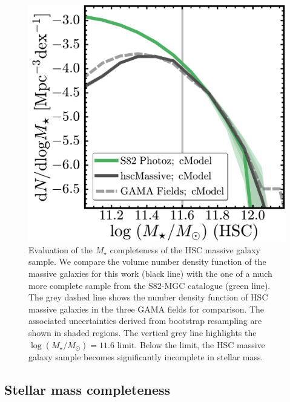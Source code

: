 \documentclass[fleqn,usenatbib]{mnras}
\def\mstar{{$M_{\star}$}}
\def\logms{{$\log (M_{\star}/M_{\odot})$}}
\begin{document}
  \begin{figure}
      \centering 
      \includegraphics[width=\columnwidth]{fig/redbcg_completeness}
      \caption{
          Evaluation of the \mstar{} completeness of the HSC massive galaxy sample.
          We compare the volume number density function of the massive galaxies 
          for this work (black line) with the one of a much more complete sample
          from the S82-MGC catalogue (green line). 
          The grey dashed line shows the number density function of HSC massive 
          galaxies in the three GAMA fields for comparison.
          The associated uncertainties derived from bootstrap resampling are shown in 
          shaded regions. 
          The vertical grey line highlights the \logms{}$=11.6$ limit.  
          Below the limit, the HSC massive galaxy sample becomes significantly incomplete in 
          stellar mass. 
          }
      \label{fig:mass_complete}
  \end{figure}     

\subsection{Stellar mass completeness}
    \label{ssec:complete}
    
\end{document}
